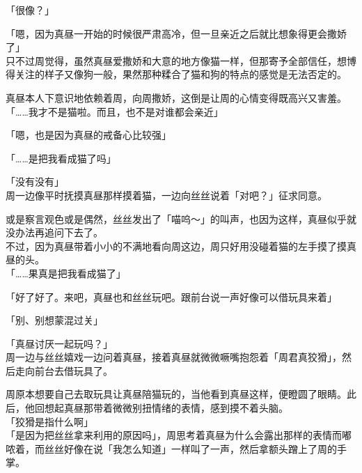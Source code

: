 「很像？」

「嗯，因为真昼一开始的时候很严肃高冷，但一旦亲近之后就比想象得更会撒娇了」\\

只不过周觉得，虽然真昼爱撒娇和大意的地方像猫一样，但那寄予全部信任，想博得关注的样子又像狗一般，果然那种糅合了猫和狗的特点的感觉是无法否定的。

真昼本人下意识地依赖着周，向周撒娇，这倒是让周的心情变得既高兴又害羞。\\

「……我才不是猫啦。而且，也不是对谁都会亲近」

「嗯，也是因为真昼的戒备心比较强」

「……是把我看成猫了吗」

「没有没有」\\

周一边像平时抚摸真昼那样摸着猫，一边向丝丝说着「对吧？」征求同意。

或是察言观色或是偶然，丝丝发出了「喵呜～」的叫声，也因为这样，真昼似乎就没办法再追问下去了。\\

不过，因为真昼带着小小的不满地看向周这边，周只好用没碰着猫的左手摸了摸真昼的头。\\

「……果真是把我看成猫了」

「好了好了。来吧，真昼也和丝丝玩吧。跟前台说一声好像可以借玩具来着」

「别、别想蒙混过关」

「真昼讨厌一起玩吗？」\\

周一边与丝丝嬉戏一边问着真昼，接着真昼就微微噘嘴抱怨着「周君真狡猾」，然后走向前台去借玩具了。

周原本想要自己去取玩具让真昼陪猫玩的，当他看到真昼这样，便瞪圆了眼睛。此后，他回想起真昼那带着微微别扭情绪的表情，感到摸不着头脑。\\

「狡猾是指什么啊」\\

「是因为把丝丝拿来利用的原因吗」，周思考着真昼为什么会露出那样的表情而嘟哝着，而丝丝好像在说「我怎么知道」一样叫了一声，然后拿额头蹭上了周的手掌。
